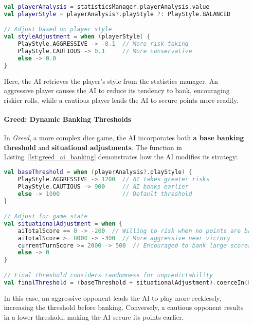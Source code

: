 \begin{lstlisting}[language=Kotlin, caption={Player Style Adjustment}, label=lst:player_style_adjustment]
val playerAnalysis = statisticsManager.playerAnalysis.value
val playerStyle = playerAnalysis?.playStyle ?: PlayStyle.BALANCED

// Adjust based on player style
val styleAdjustment = when (playerStyle) {
    PlayStyle.AGGRESSIVE -> -0.1  // More risk-taking
    PlayStyle.CAUTIOUS -> 0.1     // More conservative
    else -> 0.0
}
\end{lstlisting}

Here, the AI retrieves the player’s style from the statistics manager. An aggressive player causes the AI to reduce its tendency to bank, encouraging riskier rolls, while a cautious player leads the AI to secure points more readily.

\paragraph{Greed: Dynamic Banking Thresholds}  
In \emph{Greed}, a more complex dice game, the AI incorporates both \textbf{a base banking threshold} and \textbf{situational adjustments}. The function in Listing~\ref{lst:greed_ai_banking} demonstrates how the AI modifies its strategy:


\begin{lstlisting}[language=Kotlin, caption={AI Banking Strategy in Greed}, label=lst:greed_ai_banking]
val baseThreshold = when (playerAnalysis?.playStyle) {
    PlayStyle.AGGRESSIVE -> 1200  // AI takes greater risks
    PlayStyle.CAUTIOUS -> 900     // AI banks earlier
    else -> 1000                  // Default threshold
}

// Adjust for game state
val situationalAdjustment = when {
    aiTotalScore == 0 -> -200  // Willing to risk when no points are banked
    aiTotalScore >= 8000 -> -300  // More aggressive near victory
    currentTurnScore >= 2000 -> 500  // Encouraged to bank large scores
    else -> 0
}

// Final threshold considers randomness for unpredictability
val finalThreshold = (baseThreshold + situationalAdjustment).coerceIn(800, 2000)
\end{lstlisting}

In this case, an aggressive opponent leads the AI to play more recklessly, increasing the threshold before banking. Conversely, a cautious opponent results in a lower threshold, making the AI secure its points earlier.

